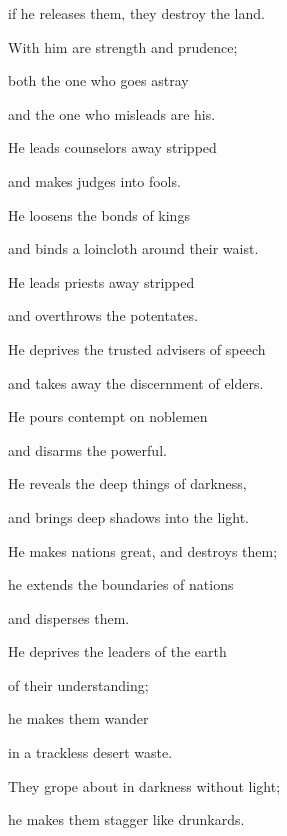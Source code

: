 {\par }{\Q if he releases
them, they destroy
the land.
\par }{\Q {}With
him are strength
and prudence;
\par }{\Q both the one who goes astray
\par }{\Q and the one who misleads are his.
\par }{\Q {}He leads
counselors
away stripped
\par }{\Q and makes judges
into fools.
\par }{\Q {}He loosens
the bonds
of kings
\par }{\Q and binds
a loincloth
around their waist.
\par }{\Q {}He leads
priests
away stripped
\par }{\Q and overthrows
the potentates.
\par }{\Q {}He deprives
the trusted
advisers of speech
\par }{\Q and takes
away the discernment
of elders.
\par }{\Q {}He pours
contempt
on
noblemen
\par }{\Q and disarms
the powerful.
\par }{\Q {}He reveals
the deep
things of darkness,
\par }{\Q and brings
deep shadows
into the light.
\par }{\Q {}He makes nations
great,
and destroys
them;
\par }{\Q he extends
the boundaries of nations
\par }{\Q and disperses them.
\par }{\Q {}He deprives
the leaders
of the earth
\par }{\Q of their understanding;

\par }{\Q he makes them wander
\par }{\Q in a trackless desert waste.
\par }{\Q {}They grope
about in darkness
without
light;
\par }{\Q he makes them stagger
like drunkards.


\par }
